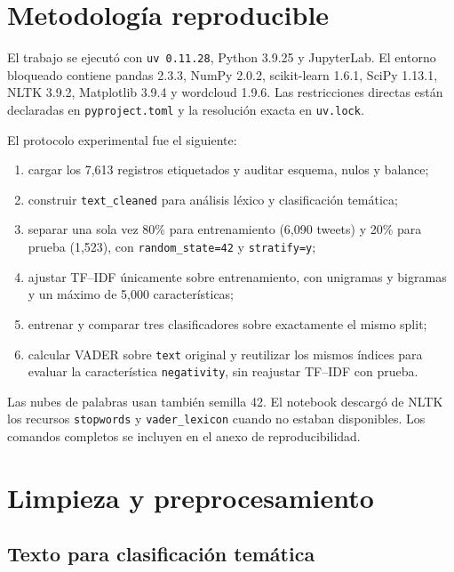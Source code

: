 \documentclass[11pt,letterpaper]{article}
\newcommand{\code}[1]{\texttt{#1}}
\begin{document}
\section{Metodología reproducible}

El trabajo se ejecutó con \code{uv 0.11.28}, Python 3.9.25 y JupyterLab. El entorno bloqueado contiene pandas 2.3.3, NumPy 2.0.2, scikit-learn 1.6.1, SciPy 1.13.1, NLTK 3.9.2, Matplotlib 3.9.4 y wordcloud 1.9.6. Las restricciones directas están declaradas en \code{pyproject.toml} y la resolución exacta en \code{uv.lock}.

El protocolo experimental fue el siguiente:
\begin{enumerate}
  \item cargar los 7,613 registros etiquetados y auditar esquema, nulos y balance;
  \item construir \code{text\_cleaned} para análisis léxico y clasificación temática;
  \item separar una sola vez 80\% para entrenamiento (6,090 tweets) y 20\% para prueba (1,523), con \code{random\_state=42} y \code{stratify=y};
  \item ajustar TF--IDF únicamente sobre entrenamiento, con unigramas y bigramas y un máximo de 5,000 características;
  \item entrenar y comparar tres clasificadores sobre exactamente el mismo split;
  \item calcular VADER sobre \code{text} original y reutilizar los mismos índices para evaluar la característica \code{negativity}, sin reajustar TF--IDF con prueba.
\end{enumerate}

Las nubes de palabras usan también semilla 42. El notebook descargó de NLTK los recursos \code{stopwords} y \code{vader\_lexicon} cuando no estaban disponibles. Los comandos completos se incluyen en el anexo de reproducibilidad.

\section{Limpieza y preprocesamiento}

\subsection{Texto para clasificación temática}
\end{document}

